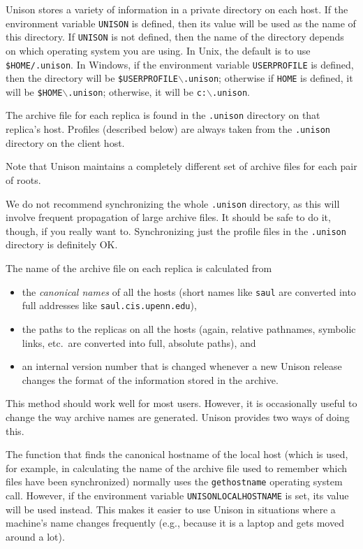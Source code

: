 \documentclass{article}
\begin{document}

Unison stores a variety of information in a private directory on each
host.  If the environment variable {\tt UNISON} is defined, then its
value will be used as the name of this directory.  If {\tt UNISON} is
not defined, then the name of the directory depends on which
operating system you are using.  In Unix, the default is to use
{\tt \$HOME/.unison}.
In Windows, if the environment variable
{\tt USERPROFILE} is defined, then the directory will be
{\tt \$USERPROFILE$\backslash$.unison};
otherwise if {\tt HOME} is defined, it will be
{\tt \$HOME$\backslash$.unison};
otherwise, it will be
{\tt c:$\backslash$.unison}.

The archive file for each replica is found in the {\tt .unison}
directory on that replica's host.  Profiles (described below) are
always taken from the {\tt .unison} directory on the client host.

Note that Unison maintains a completely different set of archive files
for each pair of roots.

We do not recommend synchronizing the whole {\tt .unison} directory, as this
will involve frequent propagation of large archive files.  It should be safe
to do it, though, if you really want to.  Synchronizing just the profile
files in the {\tt .unison} directory is definitely OK.



The name of the archive file on each replica is calculated from 
\begin{itemize}
\item the {\em canonical names} of all the hosts (short names like
  \verb|saul| are converted into full addresses like \verb|saul.cis.upenn.edu|), 
\item the paths to the replicas on all the hosts (again, relative
  pathnames, symbolic links, etc.\ are converted into full, absolute paths), and 
\item an internal version number that is changed whenever a new Unison
  release changes the format of the information stored in the archive.
\end{itemize}
This method should work well for most users.  However, it is occasionally
useful to change the way archive names are generated.  Unison provides
two ways of doing this.

The function that finds the canonical hostname of the local host (which
is used, for example, in calculating the name of the archive file used to
remember which files have been synchronized) normally uses the
\verb|gethostname| operating system call.  However, if the environment
variable \verb|UNISONLOCALHOSTNAME| is set, its value will be used
instead.  This makes it easier to use Unison in situations where a
machine's name changes frequently (e.g., because it is a laptop and gets
moved around a lot).
\end{document}
